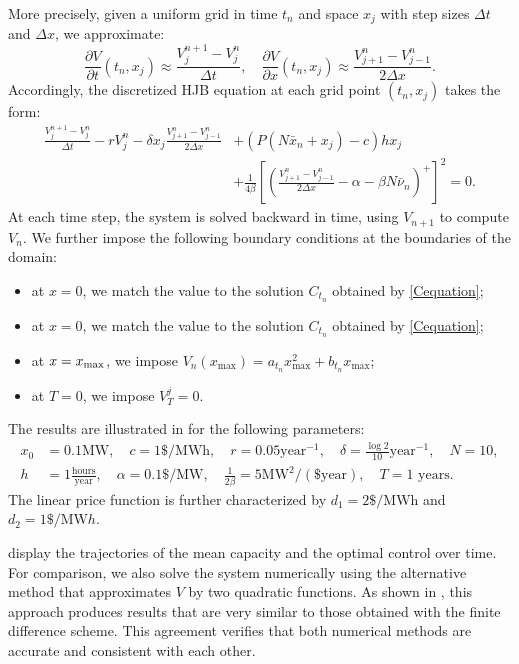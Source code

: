 \documentclass[12pt]{article}
\begin{document}
More precisely, given a uniform grid in time \(t_n\) and space \(x_j\) with step sizes \(\Delta t\) and \(\Delta x\), we approximate:
\[
\frac{\partial V}{\partial t} (t_n, x_j) \approx \frac{V^{n+1}_j - V^{n}_j}{\Delta t},
\quad
\frac{\partial V}{\partial x} (t_n, x_j) \approx \frac{V^n_{j+1} - V^n_{j-1}}{2\Delta x}.
\]
Accordingly, the discretized HJB equation at each grid point \((t_n, x_j)\) takes the form:
\begin{align*}
\frac{V^{n+1}_j - V^{n}_j}{\Delta t}
- r V^n_j
- \delta x_j \frac{V^n_{j+1} - V^n_{j-1}}{2\Delta x}
&+ (P(N \bar{x}_n + x_j) - c) hx_j\\
&+ \frac{1}{4\beta} \left[\left( \frac{V^n_{j+1} - V^n_{j-1}}{2\Delta x} - \alpha - \beta N \bar{\nu}_n \right)^+\right]^2
= 0.
\end{align*}
At each time step, the system is solved backward in time, using \(V_{n+1}\) to compute \(V_n\). We further impose the following boundary conditions at the boundaries of the domain:
\begin{itemize}\itemsep -2pt
\item[\scriptsize$\bullet$] at $x=0$, we match the value to the solution $C_{t_n}$ obtained by \eqref{Cequation};
\item[\scriptsize$\bullet$] at $x=0$, we match the value to the solution $C_{t_n}$ obtained by \eqref{Cequation};
\item[\scriptsize$\bullet$] at $x=x_{\rm max}$, we impose $V_n(x_{\max})=a_{t_n}x_{\max}^2+b_{t_n}x_{\max}$;
\item[\scriptsize$\bullet$] at $T=0$, we impose $V_{T}^{j}=0$.
\end{itemize}


The results are illustrated in  for the following parameters:
\begin{equation}
\begin{split}\label{model_param_2}
x_0 &=0.1\text{MW},\quad c=1\$/\text{MWh}, \quad r=0.05\text{year}^{-1},\quad
\delta=\frac{\log2}{10}\text{year}^{-1}, \quad N=10, \\
h&=1\frac{\text{hours}}{\text{year}},\quad \alpha=0.1\$/\text{MW},\quad\frac{1}{2\beta}=5\text{MW}^2/(\$\text{year}),\quad T=1 \text{ years.}
\end{split}
\end{equation}
The linear price function is further characterized by $d_1=2\$/\text{MWh}$ and $d_2= 1\$/\text{MW}h$. 

 display the trajectories of the mean capacity and the optimal control over time. For comparison, we also solve the system numerically using the alternative method that approximates \(V\) by two quadratic functions. As shown in , this approach produces results that are very similar to those obtained with the finite difference scheme. This agreement verifies that both numerical methods are accurate and consistent with each other. 
\end{document}

